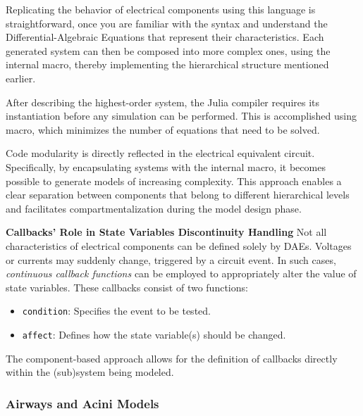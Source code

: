 Replicating the behavior of electrical components using this language
is straightforward, once you are familiar with the syntax and
understand the Differential-Algebraic Equations that represent their
characteristics.  Each generated system can then be composed into more
complex ones, using the internal  macro, thereby
implementing the hierarchical structure mentioned earlier.

After describing the highest-order system, the Julia compiler requires its
instantiation before any simulation can be performed.  This is
accomplished using  macro, which minimizes the number
of equations that need to be solved.

Code modularity is directly reflected in the electrical equivalent
circuit.  Specifically, by encapsulating systems with the internal
 macro, it becomes possible to generate models of
increasing complexity.  This approach enables a clear separation
between components that belong to different hierarchical levels and
facilitates compartmentalization during the model design phase.

\vspace{.5em}

{\normalsize\textbf{Callbacks' Role in State Variables
      Discontinuity Handling}} Not all characteristics of electrical
components can be defined solely by DAEs.  Voltages or currents may
suddenly change, triggered by a circuit event.  In such cases,
\emph{continuous callback functions} can be employed to appropriately
alter the value of state variables.  These callbacks consist of two
functions:
\begin{itemize}
\item \texttt{condition}: Specifies the event to be tested.
\item \texttt{affect}: Defines how the state variable(s) should be
  changed.
\end{itemize}

The component-based approach allows for the definition of callbacks
directly within the (sub)system being modeled.


\subsubsection{Airways and Acini Models}
\label{subsubsec:blocks_description}



